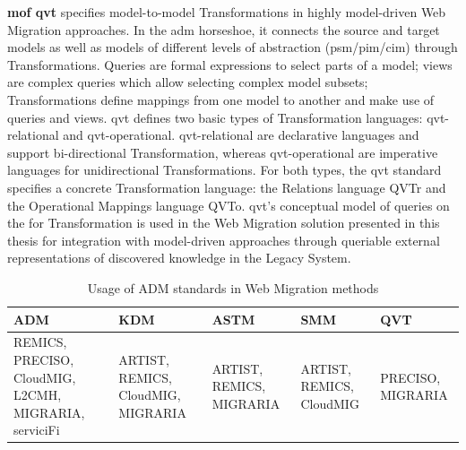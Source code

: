 \textbf{\gls{mof} \gls{qvt}} \autocite{OMG2016QVT} specifies model-to-model \glspl{Transformation} in highly model-driven \gls{Web Migration} approaches.
In the \gls{adm} horseshoe, it connects the source and target models as well as models of different levels of abstraction (\gls{psm}/\gls{pim}/\gls{cim}) through \glspl{Transformation}.
Queries are formal expressions to select parts of a model; views are complex queries which allow selecting complex model subsets; \glspl{Transformation} define mappings from one model to another and make use of queries and views.
\gls{qvt} defines two basic types of \gls{Transformation} languages: \gls{qvt}-relational and \gls{qvt}-operational.
\gls{qvt}-relational are declarative languages and support bi-directional \gls{Transformation}, whereas \gls{qvt}-operational are imperative languages for unidirectional \glspl{Transformation}.
For both types, the \gls{qvt} standard specifies a concrete \gls{Transformation} language: the Relations language QVTr and the Operational Mappings language QVTo.
\gls{qvt}'s conceptual model of queries on the  for \gls{Transformation} is used in the \gls{Web Migration} solution presented in this thesis for integration with model-driven approaches through queriable external representations of discovered knowledge in the \gls{Legacy System}.

\hypertarget{tbl:adm-usage}{}
\begin{table}[h!]
  \caption{Usage of ADM standards in \gls{Web Migration} methods}
  \label{tbl:adm-usage}
  \centering
    \begin{tabularx}{0.98\linewidth}{ XXXXX } 
    \toprule
    \textbf{ADM} & \textbf{KDM} & \textbf{ASTM} & \textbf{SMM} & \textbf{QVT}\\
    \midrule
    
   REMICS, PRECISO, CloudMIG, L2CMH, MIGRARIA, serviciFi & ARTIST, REMICS, CloudMIG, MIGRARIA & ARTIST, REMICS, MIGRARIA & ARTIST, REMICS, CloudMIG & PRECISO, MIGRARIA\\
    \bottomrule
    \end{tabularx}
\end{table}



